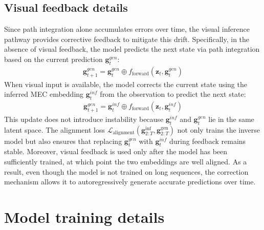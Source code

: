 \subsection{Visual feedback details}
Since path integration alone accumulates errors over time, the visual inference pathway provides corrective feedback to mitigate this drift. Specifically, in the absence of visual feedback, the model predicts the next state via path integration based on the current prediction $\boldsymbol{g}^{gen}_t$: 
\begin{equation}
    \begin{aligned}
        \boldsymbol{g}^{gen}_{t+1} = \boldsymbol{g}^{gen}_{t} \oplus f_{\text{forward}}(\boldsymbol{z}_t, \boldsymbol{g}^{gen}_{t})
    \end{aligned}
\end{equation}
When visual input is available, the model corrects the current state using the inferred MEC embedding $\boldsymbol{g}_t^{inf}$ from the observation to predict the next state: 
\begin{equation}
    \begin{aligned}
    \boldsymbol{g}^{gen}_{t+1} = \boldsymbol{g}^{inf}_{t} \oplus f_{\text{forward}}(\boldsymbol{z}_t, \boldsymbol{g}^{inf}_{t})
    \end{aligned}
\end{equation}
This update does not introduce instability because $\boldsymbol{g}_t^{inf}$ and $\boldsymbol{g}_t^{gen}$ lie in the same latent space. The alignment loss $\mathcal{L}_{\text{alignment}}(\boldsymbol{g}_{2:T}^{\text{inf}}, \boldsymbol{g}_{2:T}^{\text{gen}})$ not only trains the inverse model but also ensures that replacing $\boldsymbol{g}_t^{gen}$ with $\boldsymbol{g}_t^{inf}$ during feedback remains stable. Moreover, visual feedback is used only after the model has been sufficiently trained, at which point the two embeddings are well aligned. As a result, even though the model is not trained on long sequences, the correction mechanism allows it to autoregressively generate accurate predictions over time.

\newpage
\section{Model training details}
\label{appendix:model_training_details}
